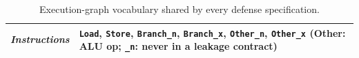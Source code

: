 \providecommand{\figfont}{\fontsize{8pt}{9.5pt}\selectfont}%
\begin{table}[t]
\centering
\caption{Execution-graph vocabulary shared by every \toolname{} defense specification.}
\label{tab:execvocab}
{%
%
\figfont%
%
\def\evgw{39pt}%
\setlength{\tabcolsep}{3pt}%
\def\evmw{\dimexpr\columnwidth-\evgw-4\tabcolsep-3\arrayrulewidth\relax}%
\renewcommand{\arraystretch}{1.0}%
\def\evt#1{\texttt{#1}}%
\begin{tabular}{|>{\raggedright\arraybackslash\itshape}p{\evgw}|>{\raggedright\arraybackslash}p{\evmw}|}%
\hline%
Instructions & \evt{Load}, \evt{Store}, \evt{Branch\_n}, \evt{Branch\_x}, \evt{Other\_n}, \evt{Other\_x} (Other: ALU op; \evt{\_n}: never in a leakage contract)\\\hline%

\end{tabular}}
\end{table}
